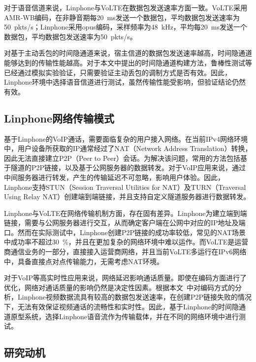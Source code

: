 对于语音信道来说，Linphone与VoLTE在数据包发送速率方面一致。VoLTE采用AMR-WB编码，在非静音期每{20\ ms}发送一个数据包，平均数据包发送速率为{50\ pkts/s}；Linphone采用opus编码，采样频率为{48\ kHz}，平均每{20\ ms}发送一个数据包，平均数据包发送速率为{50\ pkts/s}。

对基于主动丢包的时间隐通道来说，宿主信道的数据包发送速率越高，时间隐通道能够达到的传输性能越高。对于本文中提出的时间隐通道构建方法，鲁棒性测试等已经通过模拟实验验证，只需要验证主动丢包的调制方式是否有效。因此，Linphone环境中选择语音信道进行测试，虽然传输性能受影响，但验证结论仍然有效。

\subsection{Linphone网络传输模式}
\label{chap:linphone:motivation:net}

基于Linphone的VoIP通话，需要面临复杂的用户接入网络。在当前IPv4网络环境中，用户设备所获取的IP通常经过了NAT（Network Address Translation）转换，因此无法直接建立P2P（Peer to Peer）会话。为解决该问题，常用的方法包括基于隧道的P2P链接，以及基于公网服务器的数据转发。对于VoIP应用来说，通过中间服务器进行转发，产生的传输延迟不可忽略，影响用户体验。因此，Linphone支持STUN（Session Traversal Utilities for NAT）及TURN（Traversal Using Relay NAT）创建端到端链接，并且支持自定义隧道服务器进行数据转发。

Linphone与VoLTE在网络传输机制方面，存在固有差异。Linphone为建立端到端链接，需要与公网服务器进行交互，从而确定客户端在公网中对应的IP地址及端口。然而在实际测试中，Linphone创建P2P链接的成功率较低，常见的NAT场景中成功率不超过30\ \%，并且在更加复杂的网络环境中难以运作。而VoLTE是运营商通信业务的一部分，直接接入运营商网络，并且当前VoLTE多运行在IPv6网络中，具备直接点对点传输能力，无需考虑NAT环境。

对于VoIP等高实时性应用来说，网络延迟影响通话质量。即使在编码方面进行了优化，网络对通话质量的影响仍然是决定性因素。根据本文\ 中对编码方式的分析，Linphone视频数据流具有较高的数据包发送速率，在创建P2P链接失败的情况下，无法有效保证视频通话的流畅性和实时性。因此，基于Linphone的时间隐通道原型系统，选择Linphone语音流作为传输载体，并在不同的网络环境中进行测试。

\subsection{研究动机}
\label{chap:linphone:motivation:sum}


